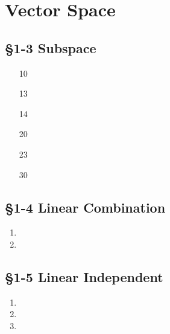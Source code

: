 


\cfoot{\thepage} %

\section{Vector Space}
	\subsection*{\S 1-3 Subspace} 
 
 \begin{enumerate}
   \item[10] 
   \item[13] 
   \item[14] 
   \item[20] 
   \item[23] 
   \item[30] 
   
 \end{enumerate}
 
 \subsection*{\S 1-4 Linear Combination}
 
 \begin{enumerate}
 	\item 
   \item 
   
 \end{enumerate}
 
 \subsection*{\S 1-5 Linear Independent}
 
 \begin{enumerate}
 	\item 
   \item 
   \item 
 \end{enumerate}
 
 



